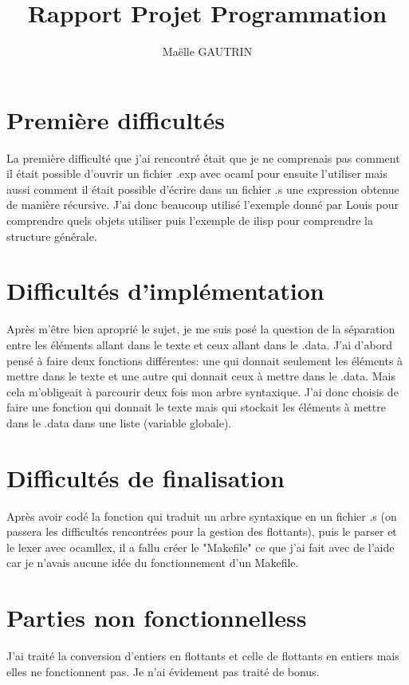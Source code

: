 \documentclass{article}
\title{Rapport Projet Programmation}
\author{Maëlle GAUTRIN}
\begin{document}
\maketitle

\section{Première difficultés}
La première difficulté que j'ai rencontré était que je ne comprenais pas comment il était possible d'ouvrir un fichier .exp avec ocaml pour ensuite l'utiliser mais aussi comment il était possible d'écrire dans un fichier .s une expression obtenue de manière récursive. J'ai donc beaucoup utilisé l'exemple donné par Louis pour comprendre quels objets utiliser puis l'exemple de ilisp pour comprendre la structure générale.

\section{Difficultés d'implémentation}
Après m'être bien aproprié le sujet, je me suis posé la question de la séparation entre les éléments allant dans le texte et ceux allant dans le .data. J'ai d'abord pensé à faire deux fonctions différentes: une qui donnait seulement les éléments à mettre dans le texte et une autre qui donnait ceux à mettre dans le .data. Mais cela m'obligeait à parcourir deux fois mon arbre syntaxique. J'ai donc choisis de faire une fonction qui donnait le texte mais qui stockait les éléments à mettre dans le .data dans une liste (variable globale).

\section{Difficultés de finalisation}
Après avoir codé la fonction qui traduit un arbre syntaxique en un fichier .s (on passera les difficultés rencontrées pour la gestion des flottants), puis le parser et le lexer avec ocamllex, il a fallu créer le "Makefile" ce que j'ai fait avec de l'aide car je n'avais aucune idée du fonctionnement d'un Makefile.

\section{Parties non fonctionnelless}
J'ai traité la conversion d'entiers en flottants et celle de flottants en entiers mais elles ne fonctionnent pas.
Je n'ai évidement pas traité de bonus.
\end{document}
